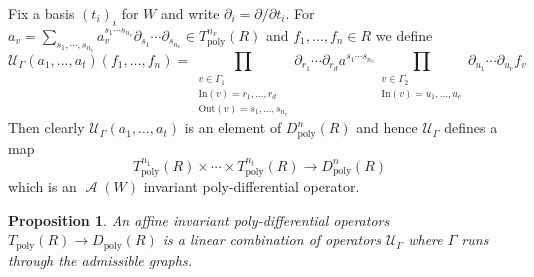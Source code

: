 \documentclass{amsart}
\numberwithin{equation}{section}
\let\cal\mathcal
\newtheorem{propositions}[lemmas]{Proposition}
\theoremstyle{definition}
\theoremstyle{remark}
\begin{document}
Fix a basis $(t_i)_i$ for $W$ and write $\partial_i=\partial/\partial
t_i$.
For $a_{v}=\sum_{s_1,\cdots, s_{n_v}}a_v^{s_1\cdots
    s_{n_v}}\partial_{s_1}\cdots \partial_{s_{n_v}} \in
  T^{n_v}_{\operatorname{poly}}(R)$  and $f_1,\ldots,f_n\in R$ we define
\[
{{\cal U}}_\Gamma(a_1,\ldots,a_t)(f_1,\ldots,f_n)=
\prod_{\begin{smallmatrix}
v\in \Gamma_1\\
\text{In}(v)={r_1,\ldots,r_d}\\
\text{Out}(v)={s_1,\ldots,s_{n_v}}
\end{smallmatrix}
}
 \partial_{{r_1}}\cdots \partial_{{r_d}} a^{s_1\cdots s_{n_v}}
\prod_{
\begin{smallmatrix}
v\in \Gamma_2\\
\text{In}(v)={u_1,\ldots,u_e}
\end{smallmatrix}
}
\partial_{{u_1}}\cdots \partial_{{u_e}}f_v
\]
Then clearly ${{\cal U}}_\Gamma(a_1,\ldots,a_t)$ is an element of
$D_{\operatorname{poly}}^{n}(R)$ and hence ${{\cal U}}_\Gamma$ defines a map
\[
T^{n_1}_{\operatorname{poly}}(R)\times\cdots\times T^{n_t}_{\operatorname{poly}}(R)\rightarrow D^{n}_{\operatorname{poly}}(R)
\]
which is an ${\operatorname{{\cal A}}}(W)$ invariant poly-differential operator. 
\begin{propositions}\label{ref-A.7.1-78} An affine invariant poly-differential operators
  $T_{\operatorname{poly}}(R)\rightarrow D_{\operatorname{poly}}(R)$ is a linear combination of operators
  ${{\cal U}}_\Gamma$ where $\Gamma$ runs through the admissible graphs.
\end{propositions}
\end{document}

